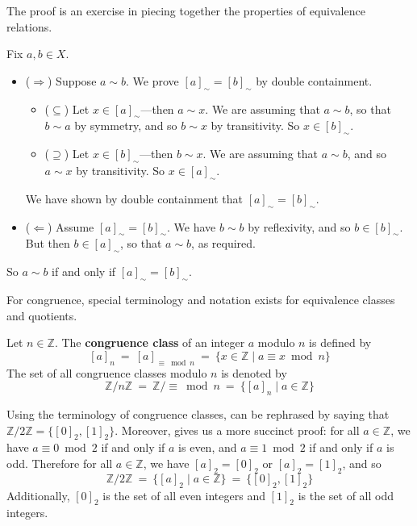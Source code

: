 \begin{cproof}
The proof is an exercise in piecing together the properties of equivalence relations.

Fix $a, b \in X$.
\begin{itemize}
\item ($\Rightarrow$) Suppose $a \sim b$. We prove $[a]_{\sim} = [b]_{\sim}$ by double containment.
\begin{itemize}
\item ($\subseteq$) Let $x \in [a]_{\sim}$---then $a \sim x$. We are assuming that $a \sim b$, so that $b \sim a$ by symmetry, and so $b \sim x$ by transitivity. So $x \in [b]_{\sim}$.
\item ($\supseteq$) Let $x \in [b]_{\sim}$---then $b \sim x$. We are assuming that $a \sim b$, and so $a \sim x$ by transitivity. So $x \in [a]_{\sim}$.
\end{itemize}
We have shown by double containment that $[a]_{\sim} = [b]_{\sim}$.

\item ($\Leftarrow$) Assume $[a]_{\sim} = [b]_{\sim}$. We have $b \sim b$ by reflexivity, and so $b \in [b]_{\sim}$. But then $b \in [a]_{\sim}$, so that $a \sim b$, as required.
\end{itemize}

So $a \sim b$ if and only if $[a]_{\sim} = [b]_{\sim}$.
\end{cproof}

For congruence, special terminology and notation exists for equivalence classes and quotients.

\begin{definition}
\label{defCongruenceClass}
Let $n \in \mathbb{Z}$. The \textbf{congruence class} of an integer $a$ modulo $n$ is defined by
\[ [a]_n ~=~ [a]_{\equiv \bmod n} ~=~ \{ x \in \mathbb{Z} \mid a \equiv x \bmod n \} \]
The set of all congruence classes modulo $n$ is denoted by
\[ \mathbb{Z}/n\mathbb{Z} ~=~ \mathbb{Z}/{\equiv \bmod n} ~=~ \{ [a]_n \mid a \in \mathbb{Z} \} \]
\end{definition}

\begin{example}
Using the terminology of congruence classes,  can be rephrased by saying that $\mathbb{Z}/2\mathbb{Z} = \{ [0]_2, [1]_2 \}$. Moreover,  gives us a more succinct proof: for all $a \in \mathbb{Z}$, we have $a \equiv 0 \bmod 2$ if and only if $a$ is even, and $a \equiv 1 \bmod 2$ if and only if $a$ is odd. Therefore for all $a \in \mathbb{Z}$, we have $[a]_2 = [0]_2$ or $[a]_2 = [1]_2$, and so
\[ \mathbb{Z}/2\mathbb{Z} ~=~ \{ [a]_2 \mid a \in \mathbb{Z} \} ~=~ \{ [0]_2, [1]_2 \} \]
Additionally, $[0]_2$ is the set of all even integers and $[1]_2$ is the set of all odd integers.
\end{example}

